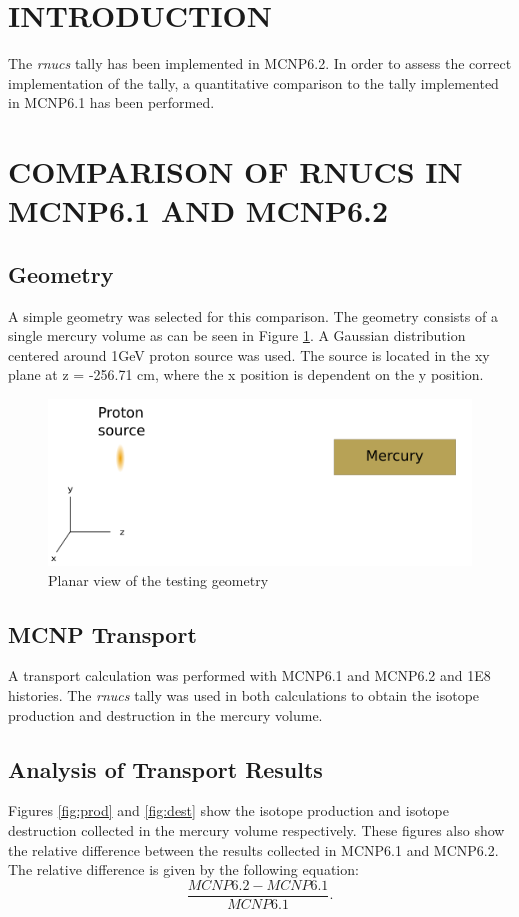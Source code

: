 \section{INTRODUCTION}

The \textit{rnucs} tally has been implemented in MCNP6.2. In order
to assess the correct implementation of the tally, a quantitative
comparison to the tally implemented in MCNP6.1 has been performed.

\section{COMPARISON OF RNUCS IN MCNP6.1 AND MCNP6.2}

\subsection{Geometry}
A simple geometry was selected for this comparison. 
The geometry consists of a single mercury volume as can be seen in Figure \ref{fig:merbox.png}.
A Gaussian distribution centered around 1GeV proton source was used. 
The source is located in the xy plane at z = -256.71 cm, where the x position is
dependent on the y position. 


\begin{figure}[h!]
        \centering
        \includegraphics[scale=0.7]{figs/mercury.png}
        \caption[VPI]{Planar view of the testing geometry}
        \label{fig:merbox.png}
\end{figure}


\subsection{MCNP Transport}
A transport calculation was performed with MCNP6.1 and MCNP6.2 and 1E8 histories.
The \textit{rnucs} tally was used in both calculations to obtain
the isotope production and destruction in the mercury volume. 

\subsection{Analysis of Transport Results}
Figures \ref{fig:prod} and \ref{fig:dest}  show the isotope production
and isotope destruction collected in the mercury volume respectively. These figures also
show the relative difference between the results collected in MCNP6.1
and MCNP6.2. 
The relative difference is given by the following equation:
\begin{equation}
	\frac{MCNP6.2 - MCNP6.1}{MCNP6.1}.
\end{equation}

